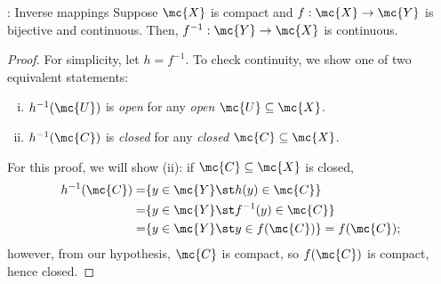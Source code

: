 \begin{ntheorem}{: Inverse mappings}
	Suppose \(\mc{X}\) is compact and \(f:\mc{X}\to\mc{Y}\) is bijective and continuous. Then, \(f^{-1}:\mc{Y}\to\mc{X}\) is continuous.
\end{ntheorem}
\begin{proof}
	For simplicity, let \(h=f^{-1}\). To check continuity, we show one of two equivalent statements:
	\begin{enumerate}[(i)]
		\item \(h^{-1}(\mc{U})\) is \emph{open} for any \emph{open} \(\mc{U}\subseteq\mc{X}\).
		
		\item \(h^{-1}(\mc{C})\) is \emph{closed} for any \emph{closed} \(\mc{C}\subseteq\mc{X}\).
	\end{enumerate}
	For this proof, we will show (ii): if \(\mc{C}\subseteq\mc{X}\) is closed, 
	\begin{align*}
		h^{-1}(\mc{C})=&\{y\in\mc{Y}\st h(y)\in\mc{C}\}\\
		=&\{y\in\mc{Y}\st f^{-1}(y)\in\mc{C}\}\\
		=&\{y\in\mc{Y}\st y\in f(\mc{C})\}=f(\mc{C});
	\end{align*}
	however, from our hypothesis, \(\mc{C}\) is compact, so \(f(\mc{C})\) is compact, hence closed.
\end{proof}